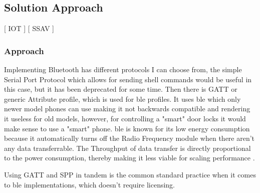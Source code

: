 \subsection{Solution Approach}
[ IOT ] [ SSAV ] 
\subsubsection{\textbf{Approach}}
 Implementing Bluetooth has different protocols I can choose from,  the simple Serial Port Protocol which allows for sending shell commands would be useful in this case, but it has been deprecated for some time. Then there is GATT \cite{BluetoothTechnologyWebsite_2023} or generic Attribute profile, which is used for \gls{ble} profiles. It uses \gls{ble} which only newer model phones can use making it not backwards compatible and rendering it useless for old models, however, for controlling a "smart" door locks it would make sense to use a "smart" phone. \gls{ble} is known for its low energy consumption because it automatically turns off the Radio Frequency module when there aren't any data transferrable. The Throughput of data transfer is directly proportional to the power consumption, thereby making it less viable for scaling performance 
 \cite{Tosi_Taffoni_Santacatterina_Sannino_Formica_2017}.
 
 Using GATT and SPP in tandem is the common standard practice when it comes to \gls{ble} implementations, which doesn't require licensing. 
 
